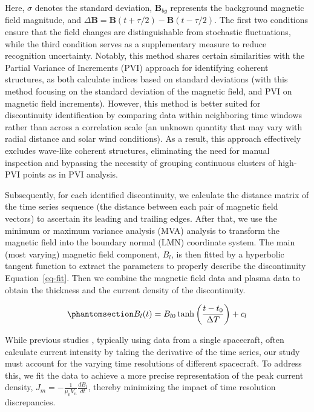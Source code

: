 \documentclass[
  letterpaper,
  DIV=11,
  numbers=noendperiod]{scrartcl}
\begin{document}
Here, \(\sigma\) denotes the standard deviation, \({\mathbf B}_{bg}\) represents the background magnetic field magnitude, and \(\Delta {\mathbf B}={\mathbf B}(t+τ/2)-{\mathbf B}(t-τ/2)\). The first two conditions ensure that the field changes are distinguishable from stochastic fluctuations, while the third condition serves as a supplementary measure to reduce recognition uncertainty. Notably, this method shares certain similarities with the Partial Variance of Increments (PVI) approach for identifying coherent structures, as both calculate indices based on standard deviations (with this method focusing on the standard deviation of the magnetic field, and PVI on magnetic field increments). However, this method is better suited for discontinuity identification by comparing data within neighboring time windows rather than across a correlation scale (an unknown quantity that may vary with radial distance and solar wind conditions). As a result, this approach effectively excludes wave-like coherent structures, eliminating the need for manual inspection and bypassing the necessity of grouping continuous clusters of high-PVI points as in PVI analysis.

Subsequently, for each identified discontinuity, we calculate the distance matrix of the time series sequence (the distance between each pair of magnetic field vectors) to ascertain its leading and trailing edges.
After that, we use the minimum or maximum variance analysis (MVA) analysis \citep{sonnerupMinimumMaximumVariance1998, sonnerupMagnetopauseStructureAttitude1967} to transform the magnetic field into the boundary normal (LMN) coordinate system.
The main (most varying) magnetic field component, \(B_l\), is then fitted by a hyperbolic tangent function to extract the parameters to properly describe the discontinuity Equation~\ref{eq-fit}. Then we combine the magnetic field data and plasma data to obtain the thickness and the current density of the discontinuity.

\begin{equation}\phantomsection\label{eq-fit}{
B_l(t) = B_{l0} \tanh\left(\frac{t - t_0}{\Delta T}\right) + c_l
}\end{equation}

While previous studies \citep{vaskoKineticscaleCurrentSheets2021, vaskoKineticscaleCurrentSheets2022}, typically using data from a single spacecraft, often calculate current intensity by taking the derivative of the time series, our study must account for the varying time resolutions of different spacecraft. To address this, we fit the data to achieve a more precise representation of the peak current density, \(J_m = - \frac{1}{\mu_0 V_n} \frac{d B_l}{d t}\), thereby minimizing the impact of time resolution discrepancies.
\end{document}
